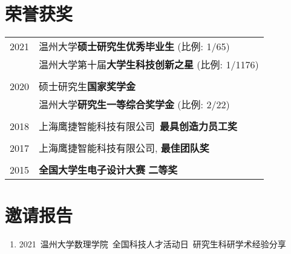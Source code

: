 \documentclass[a4paper,10pt]{article} %
\begin{document}
\section{荣誉获奖}
\begin{tabular}{r|l}	
2021                        & 温州大学\textbf{硕士研究生优秀毕业生} (比例: 1/65)\\
         	     				& 温州大学第十届\textbf{大学生科技创新之星} (比例: 1/1176)\\
\multicolumn{2}{c}{} \\	%

2020                        & 硕士研究生\textbf{国家奖学金}  \\   	
                            & 温州大学\textbf{研究生一等综合奖学金}  (比例: 2/22) \\
\multicolumn{2}{c}{} \\	%

2018                     & 上海鹰捷智能科技有限公司\ \textbf{最具创造力员工奖}\\
\multicolumn{2}{c}{} \\	%

2017                     & 上海鹰捷智能科技有限公司, \textbf{最佳团队奖} \\
\multicolumn{2}{c}{} \\	%

2015                     & \textbf{全国大学生电子设计大赛} \textbf{二等奖} \\
\end{tabular}


\section{邀请报告}  
\begin{small}
	\begin{enumerate}
		\item 2021\ 温州大学数理学院\ 全国科技人才活动日\ 研究生科研学术经验分享
	\end{enumerate}
\end{small}
\end{document}
